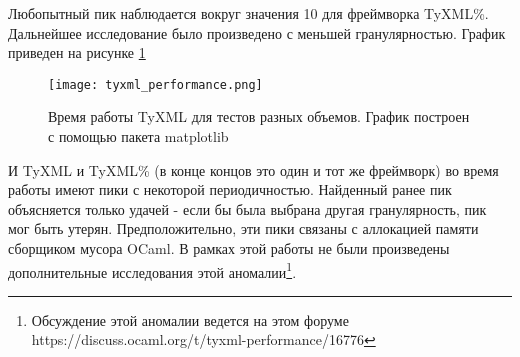 Любопытный пик наблюдается вокруг значения 10 для фреймворка TyXML\%.
Дальнейшее исследование было произведено с меньшей гранулярностью.
График приведен на рисунке \ref{fig:tyxml_perfomance}
\begin{figure}[h!]
    \texttt{[image: tyxml\_performance.png]}
    \caption{Время работы TyXML для тестов разных объемов. График построен с помощью пакета matplotlib}
    \label{fig:tyxml_perfomance}
\end{figure}

И TyXML и TyXML\% (в конце концов это один и тот же фреймворк) во время работы имеют пики с некоторой периодичностью.
Найденный ранее пик объясняется только удачей - если бы была выбрана другая гранулярность, пик мог быть утерян.
Предположительно, эти пики связаны с аллокацией памяти сборщиком мусора OCaml.
В рамках этой работы не были произведены дополнительные исследования этой аномалии\footnote{Обсуждение этой аномалии ведется на этом форуме https://discuss.ocaml.org/t/tyxml-performance/16776}.
